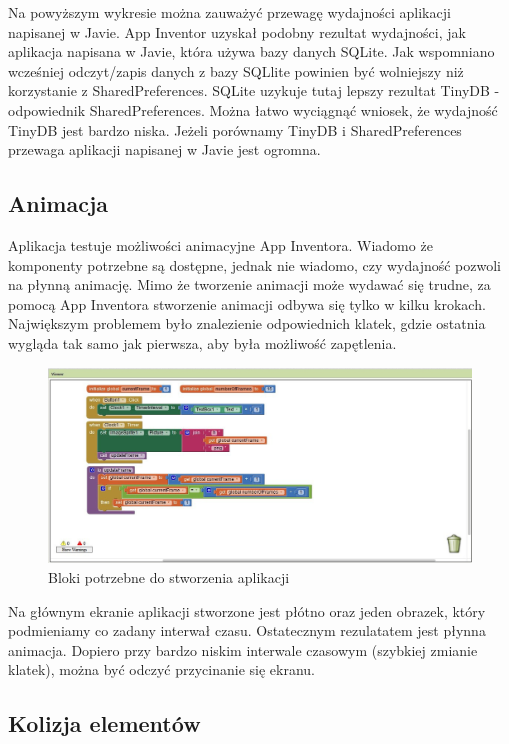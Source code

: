 Na powyższym wykresie można zauważyć przewagę wydajności aplikacji napisanej w Javie. App Inventor uzyskał podobny rezultat wydajności, jak aplikacja napisana w Javie, która używa bazy danych SQLite. Jak wspomniano wcześniej odczyt/zapis danych z bazy SQLlite powinien być wolniejszy niż korzystanie z SharedPreferences. SQLite uzykuje tutaj lepszy rezultat TinyDB - odpowiednik SharedPreferences. Można łatwo wyciągnąć wniosek, że wydajność TinyDB jest bardzo niska. Jeżeli porównamy TinyDB i SharedPreferences przewaga aplikacji napisanej w Javie jest ogromna.


\subsection{Animacja}

Aplikacja testuje możliwości animacyjne App Inventora. Wiadomo że komponenty potrzebne są dostępne, jednak nie wiadomo, czy wydajność pozwoli na płynną animację. Mimo że tworzenie animacji może wydawać się trudne, za pomocą App Inventora stworzenie animacji odbywa się tylko w kilku krokach. Największym problemem było znalezienie odpowiednich klatek, gdzie ostatnia wygląda tak samo jak pierwsza, aby była możliwość zapętlenia.


\begin{figure}[H]
\centering\includegraphics[width=15cm]{figures/apps/ai_animation}
\caption{Bloki potrzebne do stworzenia aplikacji}
\end{figure}

Na głównym ekranie aplikacji stworzone jest płótno oraz jeden obrazek, który podmieniamy co zadany interwał czasu. Ostatecznym rezulatatem jest płynna animacja. Dopiero przy bardzo niskim interwale czasowym (szybkiej zmianie klatek), można być odczyć przycinanie się ekranu.


\subsection{Kolizja elementów}

